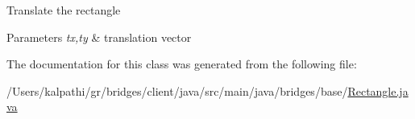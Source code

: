 Translate the rectangle


\begin{DoxyParams}{Parameters}
{\em tx,ty} & translation vector \\
\hline
\end{DoxyParams}


The documentation for this class was generated from the following file\+:\begin{DoxyCompactItemize}
\item 
/\+Users/kalpathi/gr/bridges/client/java/src/main/java/bridges/base/\mbox{\hyperlink{_rectangle_8java}{Rectangle.\+java}}\end{DoxyCompactItemize}
